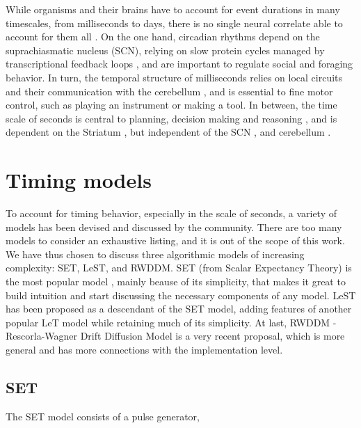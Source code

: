     While organisms and their brains have to account for event durations in many timescales, from milliseconds to days, there is no single neural correlate able to account for them all \cite{buhusi2005makes, buhusi2016clocks, hardy2016neurocomputational, lewis2003distinct, mauk2004neural}. On the one hand, circadian rhythms depend on the suprachiasmatic nucleus (SCN), relying on slow protein cycles managed by transcriptional feedback loops \cite{buhusi2005makes}, and are important to regulate social and foraging behavior. In turn, the temporal structure of milliseconds relies on local circuits and their communication with the cerebellum \cite{ohmae2017cerebellar}, and is essential to fine motor control, such as playing an instrument or making a tool. In between, the time scale of seconds is central to planning, decision making and reasoning \cite{buhusi2005makes}, and is dependent on the Striatum \cite{mello2015scalable}, but independent of the SCN \cite{lewis2003interval}, and cerebellum \cite{harrington2004does}.


\section{Timing models}
\label{sec:models}
    To account for timing behavior, especially in the scale of seconds, a variety of models has been devised and discussed by the community. There are too many models to consider an exhaustive listing\cite{}, and it is out of the scope of this work. We have thus chosen to discuss three algorithmic models of increasing complexity: SET, LeST, and RWDDM. SET (from Scalar Expectancy Theory) is the most popular model \cite{}, mainly beause of its simplicity, that makes it great to build intuition and start discussing the necessary components of any model. LeST has been proposed as a descendant of the SET model, adding features of another popular LeT model while retaining much of its simplicity. At last, RWDDM - Rescorla-Wagner Drift Diffusion Model is a very recent proposal, which is more general and has more connections with the implementation level.
    
    \subsection{SET}
        The SET model consists of a pulse generator, 
        
